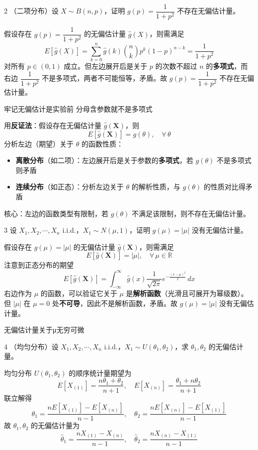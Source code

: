 \begin{homework}{2}
（二项分布）设 $X \sim B(n,p)$，证明 $g(p) = \dfrac{1}{1+p^2}$ 不存在无偏估计量。
\end{homework}
\begin{solution}
假设存在 $g(p) = \dfrac{1}{1+p^2}$ 的无偏估计量 $\hat{g}(X)$，则需满足
\[
E[\hat{g}(X)] = \sum_{k=0}^{n} \hat{g}(k)\binom{n}{k}p^k(1-p)^{n-k} = \frac{1}{1+p^2}
\]
对所有 $p \in (0,1)$ 成立。但左边展开后是关于 $p$ 的次数不超过 $n$ 的\textbf{多项式}，而右边 $\dfrac{1}{1+p^2}$ 不是多项式，两者不可能恒等，矛盾。故 $g(p) = \dfrac{1}{1+p^2}$ 不存在无偏估计量。
\end{solution}
\begin{dxtips}
牢记无偏估计是实验前
    分母含参数就不是多项式
\end{dxtips}
\begin{note}[不存在无偏估计量的证明套路]
用\textbf{反证法}：假设存在无偏估计量 $\hat{g}(\boldsymbol{X})$，则
\[
E[\hat{g}(\boldsymbol{X})] = g(\theta), \quad \forall\,\theta
\]
分析左边（期望）关于 $\theta$ 的函数性质：
\begin{itemize}
  \item \textbf{离散分布}（如二项）：左边展开后是关于参数的\textbf{多项式}，若 $g(\theta)$ 不是多项式则矛盾
  \item \textbf{连续分布}（如正态）：分析左边关于 $\theta$ 的解析性质，与 $g(\theta)$ 的性质对比得矛盾
\end{itemize}
核心：左边的函数类型有限制，若 $g(\theta)$ 不满足该限制，则不存在无偏估计量。
\end{note}
\begin{homework}{3}
设 $X_1, X_2, \cdots, X_n$ i.i.d.，$X_1 \sim N(\mu, 1)$，证明 $g(\mu) = |\mu|$ 没有无偏估计量。
\end{homework}
\begin{solution}
假设存在 $g(\mu) = |\mu|$ 的无偏估计量 $\hat{g}(\boldsymbol{X})$，则需满足
\[
E[\hat{g}(\boldsymbol{X})] = |\mu|, \quad \forall\,\mu \in \mathbb{R}
\]
注意到正态分布的期望
\[
E[\hat{g}(\boldsymbol{X})] = \int_{-\infty}^{\infty} \hat{g}(x) \frac{1}{\sqrt{2\pi}}e^{-\frac{(x-\mu)^2}{2}}\,dx
\]
右边作为 $\mu$ 的函数，可以验证它关于 $\mu$ 是\textbf{解析函数}（光滑且可展开为幂级数）。但 $|\mu|$ 在 $\mu = 0$ 处\textbf{不可导}，因此不是解析函数，矛盾。故 $g(\mu) = |\mu|$ 没有无偏估计量。
\end{solution}
\begin{dxtips}
    无偏估计量关于μ无穷可微
\end{dxtips}
\begin{homework}{4}
（均匀分布）设 $X_1, X_2, \cdots, X_n$ i.i.d.，$X_1 \sim U(\theta_1, \theta_2)$，求 $\theta_1, \theta_2$ 的无偏估计量。
\end{homework}
\begin{solution}
均匀分布 $U(\theta_1, \theta_2)$ 的顺序统计量期望为
\[
E[X_{(1)}] = \frac{n\theta_1 + \theta_2}{n+1}, \quad E[X_{(n)}] = \frac{\theta_1 + n\theta_2}{n+1}
\]
联立解得
\[
\theta_1 = \frac{nE[X_{(1)}] - E[X_{(n)}]}{n-1}, \quad \theta_2 = \frac{nE[X_{(n)}] - E[X_{(1)}]}{n-1}
\]
故 $\theta_1, \theta_2$ 的无偏估计量为
\[
\hat{\theta}_1 = \frac{nX_{(1)} - X_{(n)}}{n-1}, \quad \hat{\theta}_2 = \frac{nX_{(n)} - X_{(1)}}{n-1}
\]
\end{solution}

